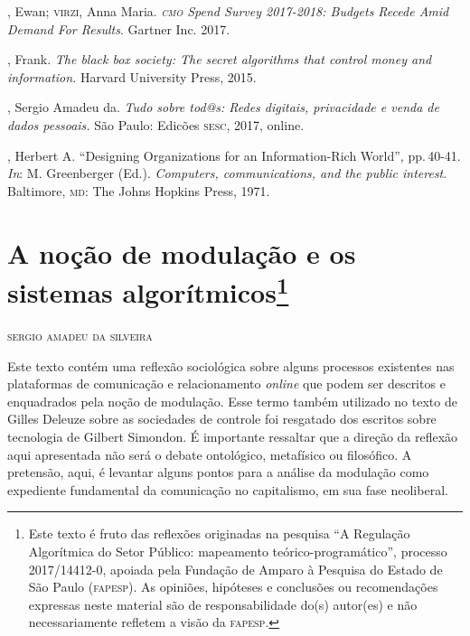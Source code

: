 \begin{bibliohedra}
, Ewan; \textsc{virzi}, Anna Maria. \emph{\textsc{cmo} Spend Survey 2017-2018:
Budgets Recede Amid Demand For Results}. Gartner Inc. 2017.

, Frank. \emph{The black box society: The secret algorithms
that control money and information.} Harvard University Press, 2015.

, Sergio Amadeu da. \emph{Tudo sobre tod@s: Redes digitais,
privacidade e venda de dados pessoais.} São Paulo: Edicões \textsc{sesc}, 2017,
online.

, Herbert A. ``Designing Organizations for an
Information-Rich World'', pp.\,40-41. \emph{In}: M. Greenberger (Ed.). \textit{Computers,
communications, and the public interest}. Baltimore, \textsc{md}: The Johns
Hopkins Press, 1971.

\end{bibliohedra}


\chapter{A noção de modulação e os sistemas algorítmicos\footnote{Este texto é fruto das reflexões originadas na pesquisa ``A Regulação Algorítmica do Setor Público: mapeamento teórico-programático'', processo 2017/14412-0, apoiada pela Fundação de Amparo à Pesquisa do Estado de São Paulo (\textsc{fapesp}). As opiniões, hipóteses e conclusões ou recomendações expressas neste material são de responsabilidade do(s) autor(es) e não necessariamente refletem a visão da \textsc{fapesp}.}}

\begin{flushright}
\textsc{sergio amadeu da silveira}
\end{flushright}


\noindent{}Este texto contém uma reflexão sociológica sobre alguns processos
existentes nas plataformas de comunicação e relacionamento \emph{online} que
podem ser descritos e enquadrados pela noção de modulação. Esse termo
também utilizado no texto de Gilles Deleuze sobre as sociedades de
controle foi resgatado dos escritos sobre tecnologia de Gilbert
Simondon. É importante ressaltar que a direção da reflexão aqui
apresentada não será o debate ontológico, metafísico ou filosófico. A
pretensão, aqui, é levantar alguns pontos para a análise da modulação
como expediente fundamental da comunicação no capitalismo, em sua fase
neoliberal.

